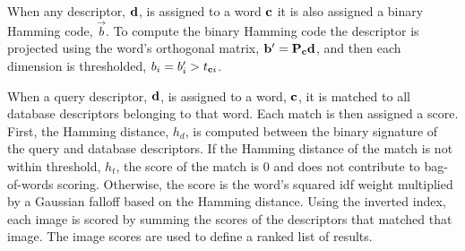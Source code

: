         When any descriptor, $\mathbf{d}$, is assigned to a word $\mathbf{c}$ it is also assigned a binary Hamming code,
        $\vec{b}$. To compute the binary Hamming code the descriptor is projected using the word's orthogonal
        matrix, $\mathbf{b}' = \mathbf{P}_{\mathbf{c}} \mathbf{d}$, and then each dimension is thresholded, $b_i = b'_i > t_{\mathbf{c}{}i}$.

        When a query descriptor, $\mathbf{d}$, is assigned to a word, $\mathbf{c}$, it is matched to all database descriptors
        belonging to that word. Each match is then assigned a score. First, the Hamming distance, $h_d$, is
        computed between the binary signature of the query and database descriptors. If the Hamming distance of the
        match is not within threshold, $h_t$, the score of the match is $0$ and does not contribute to bag-of-words
        scoring. Otherwise, the score is the word's squared idf weight multiplied by a Gaussian falloff based on
        the Hamming distance.
        Using the inverted index, each image is scored by summing the scores of the descriptors that matched that
        image. The image scores are used to define a ranked list of results.


